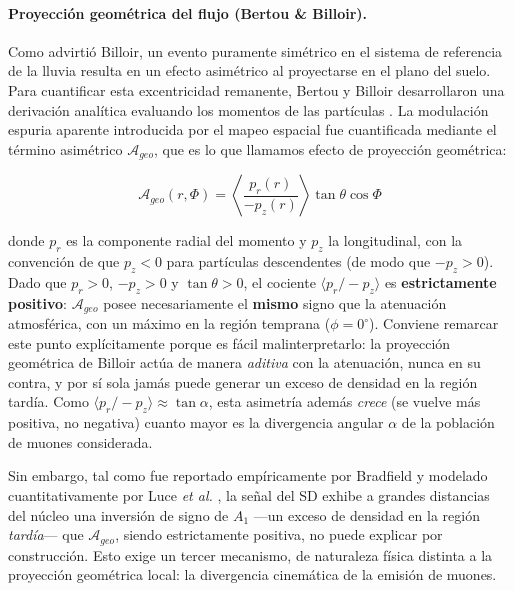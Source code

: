 \paragraph{Proyección geométrica del flujo (Bertou \& Billoir).}

Como advirtió Billoir, un evento puramente simétrico en el sistema de referencia de la lluvia resulta en un efecto asimétrico al proyectarse en el plano del suelo. Para cuantificar esta excentricidad remanente, Bertou y Billoir desarrollaron una derivación analítica evaluando los momentos de las partículas \cite{GAP2000_017}. La modulación espuria aparente introducida por el mapeo espacial fue cuantificada mediante el término asimétrico $\mathcal{A}_{geo}$, que es lo que llamamos efecto de proyección geométrica:

\begin{equation}
	\mathcal{A}_{geo}(r, \Phi) = \left\langle \frac{p_r(r)}{-p_z(r)} \right\rangle \tan \theta \cos \Phi
	\label{eq:efecto_geo}
\end{equation}

donde $p_r$ es la componente radial del momento y $p_z$ la longitudinal, con la convención de que $p_z < 0$ para partículas descendentes (de modo que $-p_z > 0$). Dado que $p_r > 0$, $-p_z > 0$ y $\tan\theta > 0$, el cociente $\langle p_r/-p_z \rangle$ es \textbf{estrictamente positivo}: $\mathcal{A}_{geo}$ posee necesariamente el \textbf{mismo} signo que la atenuación atmosférica, con un máximo en la región temprana ($\phi = 0^\circ$). Conviene remarcar este punto explícitamente porque es fácil malinterpretarlo: la proyección geométrica de Billoir actúa de manera \textit{aditiva} con la atenuación, nunca en su contra, y por sí sola jamás puede generar un exceso de densidad en la región tardía. Como $\langle p_r/-p_z\rangle \approx \tan\alpha$, esta asimetría además \textit{crece} (se vuelve más positiva, no negativa) cuanto mayor es la divergencia angular $\alpha$ de la población de muones considerada.

Sin embargo, tal como fue reportado empíricamente por Bradfield \cite{BradfieldThesis} y modelado cuantitativamente por Luce \textit{et al.} \cite{Luce_ICRC2021}, la señal del SD exhibe a grandes distancias del núcleo una inversión de signo de $A_1$ —un exceso de densidad en la región \textit{tardía}— que $\mathcal{A}_{geo}$, siendo estrictamente positiva, no puede explicar por construcción. Esto exige un tercer mecanismo, de naturaleza física distinta a la proyección geométrica local: la divergencia cinemática de la emisión de muones.

